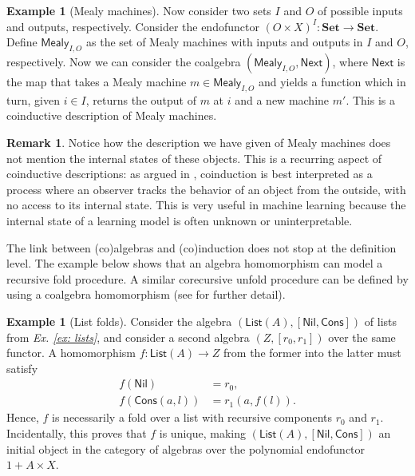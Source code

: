 \documentclass[11pt,a4paper,openright,twoside]{report}
\newcounter{mycounter}
\theoremstyle{plain}
\theoremstyle{definition}
\newtheorem{remark}[mycounter]{Remark}
\newtheorem{example}[mycounter]{Example}
\begin{document}
\begin{example}[Mealy machines]
  \label{ex: mealy}
  Now consider two sets $I$ and $O$ of possible inputs and outputs, respectively. Consider the endofunctor $(O \times X)^I: \mathbf{Set} \to \mathbf{Set}$.  Define $\mathsf{Mealy}_{I,O}$ as the set of Mealy machines with inputs and outputs in $I$ and $O$, respectively. Now we can consider the coalgebra $(\mathsf{Mealy}_{I,O}, \mathsf{Next})$, where $\mathsf{Next}$ is the map that takes a Mealy machine $m \in \mathsf{Mealy}_{I,O}$ and yields a function which in turn, given $i \in I$, returns the output of $m$ at $i$ and a new machine $m'$. This is a coinductive description of Mealy machines.
\end{example}

\begin{remark}
  Notice how the description we have given of Mealy machines does not mention the internal states of these objects. This is a recurring aspect of coinductive descriptions: as argued in \cite{jacobs1997tutorial}, coinduction is best interpreted as a process where an observer tracks the behavior of an object from the outside, with no access to its internal state. This is very useful in machine learning because the internal state of a learning model is often unknown or uninterpretable.
\end{remark}

The link between (co)algebras and (co)induction does not stop at the definition level. The example below shows that an algebra homomorphism can model a recursive fold procedure. A similar corecursive unfold procedure can be defined by using a coalgebra homomorphism (see \cite{gavranovicposition} for further detail).

\begin{example}[List folds]
  \label{ex: listfold}
  Consider the algebra $(\mathsf{List}(A), [\mathsf{Nil}, \mathsf{Cons}])$ of lists from \textit{Ex. \ref{ex: lists}}, and consider a second algebra $(Z, [r_0,r_1])$ over the same functor. A homomorphism $f: \mathsf{List}(A) \to Z$ from the former into the latter must satisfy 
  \begin{align*}
    f(\mathsf{Nil}) &= r_0,\\
    f(\mathsf{Cons}(a,l)) &= r_1(a,f(l)). 
  \end{align*}
  Hence, $f$ is necessarily a fold over a list with recursive components $r_0$ and $r_1$. Incidentally, this proves that $f$ is unique, making $(\mathsf{List}(A), [\mathsf{Nil}, \mathsf{Cons}])$ an initial object in the category of algebras over the polynomial endofunctor $1 + A \times X$.
\end{example}
\end{document}
